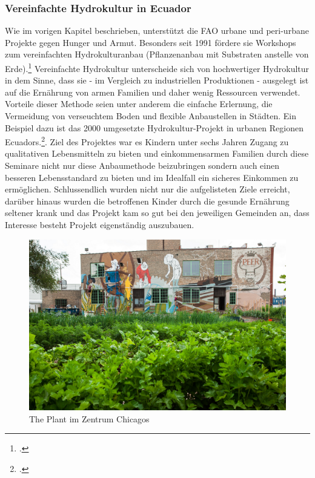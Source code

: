 \documentclass{scrartcl}
\begin{document}
\subsubsection*{Vereinfachte Hydrokultur in Ecuador}
Wie im vorigen Kapitel beschrieben, unterstützt die FAO urbane und peri-urbane Projekte gegen Hunger und Armut. Besonders seit 1991 fördere sie Workshops zum vereinfachten Hydrokulturanbau (Pflanzenanbau mit Substraten anstelle von Erde).\footcites[Vgl.][o.P. (S.1)]{Stajano2003SIMPLIFIEDEcuador} Vereinfachte Hydrokultur unterscheide sich von hochwertiger Hydrokultur in dem Sinne, dass sie - im Vergleich zu industriellen Produktionen - ausgelegt ist auf die Ernährung von armen Familien und daher wenig Ressourcen verwendet. Vorteile dieser Methode seien unter anderem die einfache Erlernung, die Vermeidung von verseuchtem Boden und flexible Anbaustellen in Städten. Ein Beispiel dazu ist das 2000 umgesetzte Hydrokultur-Projekt in urbanen Regionen Ecuadors.\footcite[Vgl.][o.P. (S.2f)]{Stajano2003SIMPLIFIEDEcuador}. Ziel des Projektes war es Kindern unter sechs Jahren Zugang zu qualitativen Lebensmitteln zu bieten und einkommensarmen Familien durch diese Seminare nicht nur diese Anbaumethode beizubringen sondern auch einen besseren Lebensstandard zu bieten und im Idealfall ein sicheres Einkommen zu ermöglichen. Schlussendlich wurden nicht nur die aufgelisteten Ziele erreicht, darüber hinaus wurden die betroffenen Kinder durch die gesunde Ernährung seltener krank und das Projekt kam so gut bei den jeweiligen Gemeinden an, dass Interesse besteht Projekt eigenständig auszubauen. 

\begin{figure}[htbp]
    \centering
    \includegraphics[width=14cm]{image_folder/the_plant_1.jpg}
    \caption{The Plant im Zentrum Chicagos}
\end{figure} 
\end{document}
